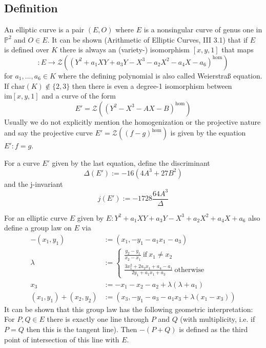 \documentclass{scrartcl}
\begin{document}
\subsection{Definition}
An elliptic curve is a pair $(E, O)$ where $E$ is a nonsingular curve of genus one in $\mathbb{P}^2$ and $O \in E$.
It can be shown (Arithmetic of Elliptic Curves, III 3.1) that if $E$ is defined over $K$ there is always an (variety-) isomorphism $[x, y, 1]$ that maps
\begin{equation*}
    [x, y, 1]: E \to \mathcal{Z}\left((Y^2 + a_1 X Y + a_3 Y - X^3 - a_2 X^2 - a_4 X - a_6)^{\mathrm{hom}}\right)
\end{equation*}
for $a_1, ..., a_6 \in K$ where the defining polynomial is also called Weierstraß equation.
If $\mathrm{char}(K) \not\in \{ 2, 3 \}$ then there is even a degree-1 isomorphism between $\mathrm{im}[x, y, 1]$ and a curve of the form
\begin{equation*}
    E' = \mathcal{Z}\left((Y^2 - X^3 - A X - B)^{\mathrm{hom}}\right)
\end{equation*}
Usually we do not explicitly mention the homogenization or the projective nature and say the projective curve $E' = \mathcal{Z}((f - g)^{\mathrm{hom}})$ is given by the equation $E': f = g$.

For a curve $E'$ given by the last equation, define the discriminant 
\begin{equation*}
    \Delta(E') := -16(4A^3 + 27B^2)
\end{equation*}    
and the j-invariant
\begin{equation*}
    j(E') := -1728 \frac {64 A^3} \Delta
\end{equation*}

For an elliptic curve $E$ given by $E: Y^2 + a_1 XY + a_3 Y - X^3 + a_2 X^2 + a_4 X + a_6$ also define a group law on $E$ via
\begin{align*}
    -(x_1, y_1) &:= (x_1, -y_1 - a_1 x_1 - a_3) \\
    \lambda &:= \begin{cases}
        \frac {y_2 - y_1} {x_2 - x_1} \ \text{if} \ x_1 \neq x_2 \\
        \frac {3 x_1^2 + 2 a_2 x_1 + a_4 - a_1} {2 y_1 + a_1 x_1 + a_3} \ \text{otherwise}
    \end{cases} \\
    x_3 &:= -x_1 - x_2 - a_2 + \lambda (\lambda + a_1) \\
    (x_1, y_1) + (x_2, y_2) &:= (x_3, -y_1 - a_3 - a_1 x_3 + \lambda (x_1 - x_3))
\end{align*}
It can be shown that this group law has the following geometric interpretation: 
For $P, Q \in E$ there is exactly one line through $P$ and $Q$ (with multiplicity, i.e. if $P = Q$ then this is the tangent line).
Then $-(P + Q)$ is defined as the third point of intersection of this line with $E$.
\end{document}
